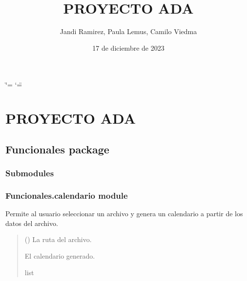 \documentclass[letterpaper,10pt,spanish]{sphinxmanual}
\title{PROYECTO ADA}
\date{17 de diciembre de 2023}
\author{Jandi Ramirez, Paula Lemus, Camilo Viedma}
\begin{document}
\ifdefined\shorthandoff
  \ifnum\catcode`\=\string=\active\shorthandoff{=}\fi
  \ifnum\catcode`\"=\active{}\fi
\fi

\pagestyle{empty}
\sphinxmaketitle
\pagestyle{plain}
\sphinxtableofcontents
\pagestyle{normal}
\label{\detokenize{index::doc}}


\sphinxstepscope


\chapter{PROYECTO ADA}
\label{\detokenize{modules:proyecto-ada}}\label{\detokenize{modules::doc}}
\sphinxstepscope


\section{Funcionales package}
\label{\detokenize{Funcionales:funcionales-package}}\label{\detokenize{Funcionales::doc}}

\subsection{Submodules}
\label{\detokenize{Funcionales:submodules}}

\subsection{Funcionales.calendario module}
\label{\detokenize{Funcionales:module-Funcionales.calendario}}\label{\detokenize{Funcionales:funcionales-calendario-module}}

\begin{fulllineitems}
\label{\detokenize{Funcionales:Funcionales.calendario.elegir_archivo}}
\pysigstartsignatures
{}
\pysigstopsignatures
\sphinxAtStartPar
Permite al usuario seleccionar un archivo y genera un calendario a partir de los datos del archivo.
\begin{quote}\begin{description}
\sphinxAtStartPar
{} () \textendash{} La ruta del archivo.

\sphinxAtStartPar
El calendario generado.

\sphinxAtStartPar
list

\end{description}\end{quote}

\end{fulllineitems}
\end{document}
